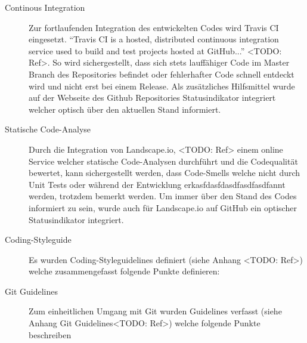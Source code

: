 \begin{description}
	\item[Continous Integration] Zur fortlaufenden Integration des entwickelten
	Codes wird Travis CI eingesetzt. \enquote{Travis CI is a hosted, distributed
	continuous integration service used to build and test projects hosted at
	GitHub...} <TODO: Ref>. So wird sichergestellt, dass sich stets lauffähiger Code
	im Master Branch des Repositories befindet oder fehlerhafter Code schnell
	entdeckt wird und nicht erst bei einem Release. Als zusätzliches Hilfsmittel
	wurde auf der Webseite des Github Repositories Statusindikator integriert
	welcher optisch über den aktuellen Stand informiert.

	\item[Statische Code-Analyse] Durch die Integration von Landscape.io, <TODO:
	Ref> einem online Service welcher statische Code-Analysen durchführt und die
	Codequalität bewertet, kann sichergestellt werden, dass Code-Smells welche
	nicht durch Unit Tests oder während der Entwicklung erkasfdasfdasdfasdfasdfannt
	werden, trotzdem bemerkt werden. Um immer über den Stand des Codes informiert
	zu sein, wurde auch für Landscape.io auf GitHub ein optischer Statusindikator
	integriert.

	\item[Coding-Styleguide] Es wurden Coding-Styleguidelines definiert (siehe
	Anhang <TODO: Ref>) welche zusammengefasst folgende Punkte definieren: 

	\item[Git Guidelines] Zum einheitlichen Umgang mit Git wurden Guidelines
	verfasst (siehe Anhang Git Guidelines<TODO: Ref>) welche folgende Punkte
	beschreiben

\end{description}

